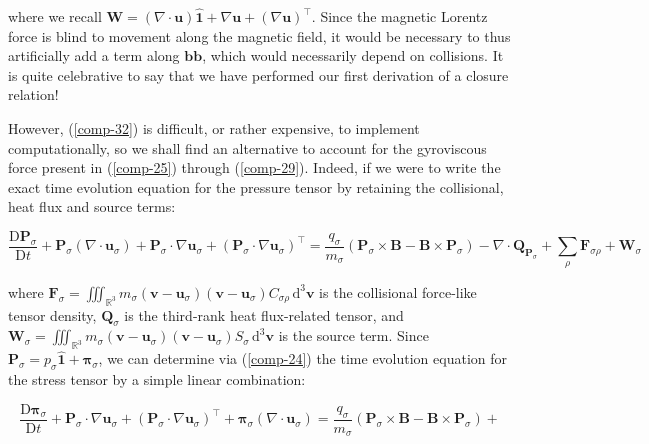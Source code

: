 where we recall $\mathbf{W}=\left(\nabla\cdot \mathbf{u}\right)\mathbf{\hat{1}}+\nabla \mathbf{u}+\left(\nabla \mathbf{u}\right)^\top$. Since the magnetic Lorentz force is blind to movement along the magnetic field, it would be necessary to thus artificially add a term along $\mathbf{b}\mathbf{b}$, which would necessarily depend on collisions. It is quite celebrative to say that we have performed our first derivation of a closure relation!

\vspace*{2.5pt}

\quad However, (\ref{comp-32}) is difficult, or rather expensive, to implement computationally, so we shall find an alternative to account for the gyroviscous force present in (\ref{comp-25}) through (\ref{comp-29}). Indeed, if we were to write the exact time evolution equation for the pressure tensor by retaining the collisional, heat flux and source terms:

\begin{equation}
    \frac{\mathrm{D}\mathbf{P}_\sigma}{\mathrm{D}t}+\mathbf{P}_\sigma \left(\nabla\cdot{\mathbf{u}_\sigma}\right)+\mathbf{P}_\sigma\cdot\nabla \mathbf{u}_\sigma+\left(\mathbf{P}_\sigma\cdot\nabla \mathbf{u}_\sigma\right)^\top = \frac{q_\sigma}{m_\sigma}\left(\mathbf{P}_\sigma\times \mathbf{B}-\mathbf{B}\times \mathbf{P}_\sigma\right)-\nabla\cdot \mathbf{Q}_{\mathbf{P}_{\sigma}}+\sum_{\rho}\mathbf{F}_{\sigma\rho} + \mathbf{W}_{\sigma}
\end{equation}

where $\mathbf{F}_\sigma=\iiint_{\mathbb{R}^3}m_\sigma \left(\mathbf{v}-\mathbf{u}_\sigma\right)\left(\mathbf{v}-\mathbf{u}_\sigma\right)C_{\sigma\rho}\,\mathrm{d^3}\mathbf{v}$ is the collisional force-like tensor density, $\mathbf{Q}_{\sigma}$ is the third-rank heat flux-related tensor, and $\mathbf{W}_\sigma =\iiint_{\mathbb{R}^3}m_\sigma \left(\mathbf{v}-\mathbf{u}_\sigma\right)\left(\mathbf{v}-\mathbf{u}_\sigma\right)S_\sigma\,\mathrm{d^3}\mathbf{v}$ is the source term. Since $\mathbf{P}_\sigma = p_\sigma \mathbf{\hat{1}}+\boldsymbol{\pi}_\sigma$, we can determine via (\ref{comp-24}) the time evolution equation for the stress tensor by a simple linear combination:

\begin{equation*}
    \frac{\mathrm{D}\boldsymbol{\pi}_\sigma}{\mathrm{D}t}+\mathbf{P}_\sigma\cdot\nabla \mathbf{u}_\sigma + \left(\mathbf{P}_\sigma\cdot\nabla \mathbf{u}_\sigma\right)^\top+\boldsymbol{\pi}_{\sigma}\left(\nabla\cdot{\mathbf{u}_\sigma}\right)=\frac{q_\sigma}{m_\sigma}\left(\mathbf{P}_\sigma\times \mathbf{B}-\mathbf{B}\times \mathbf{P}_\sigma\right)+
\end{equation*}

